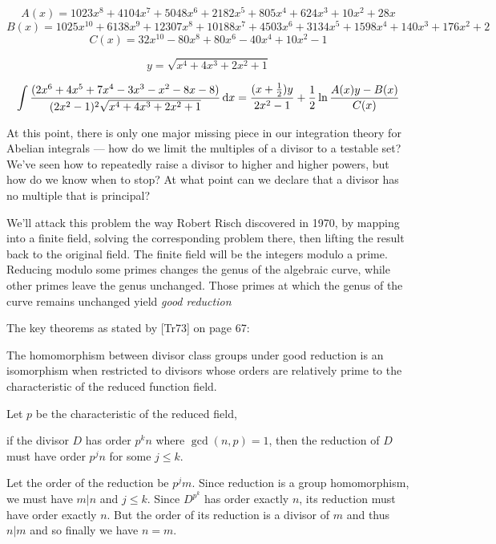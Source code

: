 
$$A(x) = 1023x^8+4104x^7+5048x^6+2182x^5+805x^4+624x^3+10x^2+28x$$
$$B(x) = 1025x^{10} + 6138x^9 + 12307x^8 + 10188x^7 + 4503x^6 + 3134x^5 + 1598x^4 + 140x^3 + 176x^2 +2$$
$$C(x) = 32x^{10}-80x^8+80x^6-40x^4+10x^2-1$$

$$y = \sqrt{x^4+4 x^3+2 x^2+1}$$

$$\int {{(2x^6+4x^5+7x^4-3x^3-x^2-8x-8)}\over{(2x^2-1)^2\sqrt{x^4+4 x^3+2 x^2+1}}} \,{\rm d}x
= {{(x+{1\over2})y}\over{2x^2-1}} + {1\over2}\ln{{A(x)y - B(x)}\over{C(x)}}
$$

\endexample


\vfill\eject
{}

At this point, there is only one major missing piece in our
integration theory for Abelian integrals --- how do we limit the
multiples of a divisor to a testable set?  We've seen how to
repeatedly raise a divisor to higher and higher powers, but how do we
know when to stop?  At what point can we declare that a divisor has no
multiple that is principal?

We'll attack this problem the way Robert Risch discovered in 1970, by
mapping into a finite field, solving the corresponding problem there,
then lifting the result back to the original field.  The finite field
will be the integers modulo a prime.  Reducing modulo some primes
changes the genus of the algebraic curve, while other primes leave the
genus unchanged.  Those primes at which the genus of the curve remains
unchanged yield {\it good reduction}

The key theorems as stated by [Tr73] on page 67:

\theorem
The homomorphism between divisor class groups under good reduction
is an isomorphism when restricted to divisors whose orders are
relatively prime to the characteristic of the reduced function field.
\endtheorem

Let $p$ be the characteristic of the reduced field,

\theorem
if the divisor $D$ has order $p^k n$ where $\gcd(n,p)=1$, then
the reduction of $D$ must have order $p^j n$ for some $j\le k$.

\proof
Let the order of the reduction be $p^j m$.  Since reduction
is a group homomorphism, we must have $m|n$ and $j \le k$.
Since $D^{p^k}$ has order exactly $n$, its reduction
must have order exactly $n$.  But the order of its
reduction is a divisor of $m$ and thus $n|m$ and so
finally we have $n=m$.


